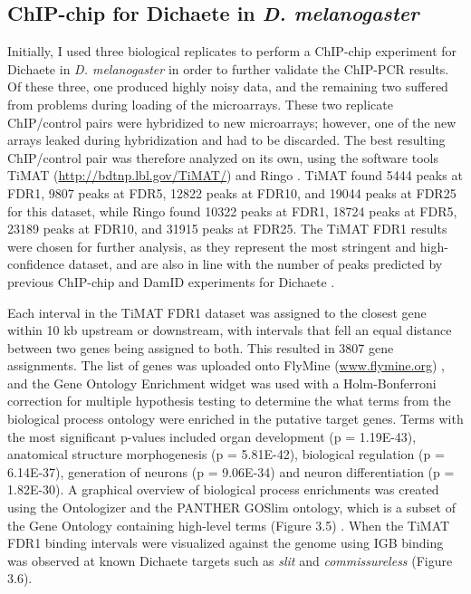 \subsection{ChIP-chip for Dichaete in \emph{D. melanogaster}}
Initially, I used three biological replicates to perform a ChIP-chip experiment for Dichaete in \emph{D. melanogaster} in order to further validate the ChIP-PCR results. Of these three, one produced highly noisy data, and the remaining two suffered from problems during loading of the microarrays. These two replicate ChIP/control pairs were hybridized to new microarrays; however, one of the new arrays leaked during hybridization and had to be discarded. The best resulting ChIP/control pair was therefore analyzed on its own, using the software tools TiMAT (\url{http://bdtnp.lbl.gov/TiMAT/}) and Ringo \citep{toedling_ringo_2007}. TiMAT found 5444 peaks at FDR1, 9807 peaks at FDR5, 12822 peaks at FDR10, and 19044 peaks at FDR25 for this dataset, while Ringo found 10322 peaks at FDR1, 18724 peaks at FDR5, 23189 peaks at FDR10, and 31915 peaks at FDR25. The TiMAT FDR1 results were chosen for further analysis, as they represent the most stringent and high-confidence dataset, and are also in line with the number of peaks predicted by previous ChIP-chip and DamID experiments for Dichaete \citep{aleksic_role_2013}.

Each interval in the TiMAT FDR1 dataset was assigned to the closest gene within 10 kb upstream or downstream, with intervals that fell an equal distance between two genes being assigned to both. This resulted in 3807 gene assignments. The list of genes was uploaded onto FlyMine (\url{www.flymine.org}) \citep{lyne_flymine:_2007}, and the Gene Ontology Enrichment widget was used with a Holm-Bonferroni correction for multiple hypothesis testing to determine the what terms from the biological process ontology were enriched in the putative target genes. Terms with the most significant p-values included organ development (p = 1.19E-43), anatomical structure morphogenesis (p = 5.81E-42), biological regulation (p = 6.14E-37), generation of neurons (p = 9.06E-34) and neuron differentiation (p = 1.82E-30). A graphical overview of biological process enrichments was created using the Ontologizer and the PANTHER GOSlim ontology, which is a subset of the Gene Ontology containing high-level terms (Figure 3.5) \citep{bauer_ontologizer_2008}. When the TiMAT FDR1 binding intervals were visualized against the genome using IGB \citep{nicol_integrated_2009} binding was observed at known Dichaete targets such as \emph{slit} and \emph{commissureless} (Figure 3.6).

